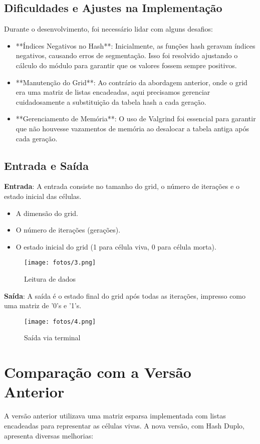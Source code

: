\documentclass[a4paper,12pt]{article}
\begin{document}
\subsection{Dificuldades e Ajustes na Implementação}
Durante o desenvolvimento, foi necessário lidar com alguns desafios:
\begin{itemize}
    \item **Índices Negativos no Hash**: Inicialmente, as funções hash geravam índices negativos, causando erros de segmentação. Isso foi resolvido ajustando o cálculo do módulo para garantir que os valores fossem sempre positivos.
    \item **Manutenção do Grid**: Ao contrário da abordagem anterior, onde o grid era uma matriz de listas encadeadas, aqui precisamos gerenciar cuidadosamente a substituição da tabela hash a cada geração.
    \item **Gerenciamento de Memória**: O uso de Valgrind foi essencial para garantir que não houvesse vazamentos de memória ao desalocar a tabela antiga após cada geração.
\end{itemize}

\subsection{Entrada e Saída}
\textbf{Entrada}: A entrada consiste no tamanho do grid, o número de iterações e o estado inicial das células.
\begin{itemize}
    \item A dimensão do grid.
    \item O número de iterações (gerações).
    \item O estado inicial do grid (1 para célula viva, 0 para célula morta).
\end{itemize}

\begin{figure}[H]
    \centering
    \texttt{[image: fotos/3.png]}
    \caption{Leitura de dados}
\end{figure}

\textbf{Saída}: A saída é o estado final do grid após todas as iterações, impresso como uma matriz de '0's e '1's.

\begin{figure}[H]
    \centering
    \texttt{[image: fotos/4.png]}
    \caption{Saída via terminal}
\end{figure}

\section{Comparação com a Versão Anterior}
A versão anterior utilizava uma matriz esparsa implementada com listas encadeadas para representar as células vivas. A nova versão, com Hash Duplo, apresenta diversas melhorias:
\end{document}
